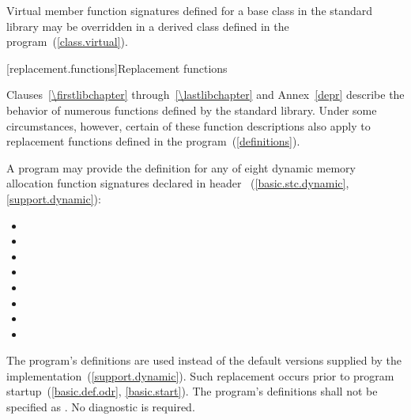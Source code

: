 \pnum
Virtual member function signatures defined
%
for a base class in the \Cpp standard
%
%
library may be overridden in a derived class defined in the program~(\ref{class.virtual}).

[replacement.functions]{Replacement functions}

\pnum
{}%
Clauses~\ref{\firstlibchapter} through~\ref{\lastlibchapter} and Annex~\ref{depr}
describe the behavior of numerous functions defined by
the \Cpp standard library.
Under some circumstances,
%
however, certain of these function descriptions also apply to replacement functions defined
in the program~(\ref{definitions}).

\pnum
A \Cpp program may provide the definition for any of eight
dynamic memory allocation function signatures declared in header
~(\ref{basic.stc.dynamic}, \ref{support.dynamic}):

\begin{itemize}
\item
{}%
%
\item
{}
\item
{}%
%
\item
{}
\item
{}%
%
\item
{}
\item
{}%
%
\item
{}
\end{itemize}

\pnum
The program's definitions are used instead of the default versions supplied by
the implementation~(\ref{support.dynamic}).
Such replacement occurs prior to program startup~(\ref{basic.def.odr}, \ref{basic.start}).
%
The program's definitions shall not be specified as
.
No diagnostic is required.

